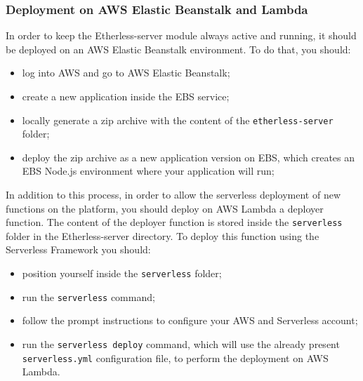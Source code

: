 \subsubsection{Deployment on AWS Elastic Beanstalk and Lambda}
	In order to keep the Etherless-server module always active and running, it should be deployed on an AWS Elastic Beanstalk environment. To do that, you should:
	\begin{itemize}
		\item log into AWS and go to AWS Elastic Beanstalk;
		\item create a new application inside the EBS service;
		\item locally generate a zip archive with the content of the \texttt{etherless-server} folder;
		\item deploy the zip archive as a new application version on EBS, which creates an EBS Node.js environment where your application will run;
	\end{itemize}
	In addition to this process, in order to allow the serverless deployment of new functions on the platform, you should deploy on AWS Lambda a deployer function. The content of the deployer function is stored inside the \texttt{serverless} folder in the Etherless-server directory. To deploy this function using the Serverless Framework you should:
	\begin{itemize}
		\item position yourself inside the \texttt{serverless} folder;
		\item run the \texttt{serverless} command;
		\item follow the prompt instructions to configure your AWS and Serverless account;
		\item run the \texttt{serverless deploy} command, which will use the already present \texttt{serverless.yml} configuration file, to perform the deployment on AWS Lambda.
	\end{itemize}

